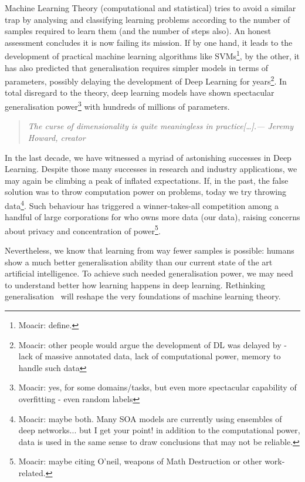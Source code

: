 Machine Learning Theory (computational and statistical) tries to avoid a similar trap by analysing and classifying learning problems according to the number of samples required to learn them (and the number of steps also). An honest assessment concludes it is now failing its mission. If by one hand, it leads to the development of practical machine learning algorithms like \acfp{SVM}\footnote{Moacir: define.}, by the other, it has also predicted that generalisation requires simpler models in terms of parameters, possibly delaying the development of Deep Learning for years\footnote{Moacir: other people would argue the development of DL was delayed by - lack of massive annotated data, lack of computational power, memory to handle such data}. In total disregard to the theory, deep learning models have shown spectacular generalisation power\footnote{Moacir: yes, for some domains/tasks, but even more spectacular capability of overfitting - even random labels} with hundreds of millions of parameters.
\begin{quote}
	\small \textit{\flushright The curse of dimensionality is quite meaningless in practice[\ldots]\cite{howard:2018ml1}.\flushright --- Jeremy Howard,  creator\\
		\vspace{1cm} }
\end{quote}

In the last decade, we have witnessed a myriad of astonishing successes in Deep Learning. Despite those many successes in research and industry applications, we may again be climbing a peak of inflated expectations. If, in the past, the false solution was to throw computation power on problems, today we try throwing data\footnote{Moacir: maybe both. Many SOA models are currently using ensembles of deep networks... but I get your point! in addition to the computational power, data is used in the same sense to draw conclusions that may not be reliable.}. Such behaviour has triggered a winner-takes-all competition among a handful of large corporations for who owns more data (our data), raising concerns about privacy and concentration of power\cite{oneil:2016}\footnote{Moacir: maybe citing O'neil, weapons of Math Destruction or other work-related.}.

Nevertheless, we know that learning from way fewer samples is possible: humans show a much better generalisation ability than our current state of the art artificial intelligence. To achieve such needed generalisation power, we may need to understand better how learning happens in deep learning. Rethinking generalisation~\cite{zhang:2016} will reshape the very foundations of machine learning theory.

